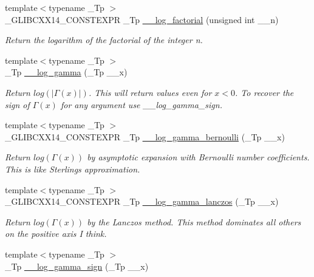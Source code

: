 \begin{DoxyCompactItemize}
{\footnotesize template$<$typename \+\_\+\+Tp $>$ }\\\+\_\+\+G\+L\+I\+B\+C\+X\+X14\+\_\+\+C\+O\+N\+S\+T\+E\+X\+P\+R \+\_\+\+Tp \hyperlink{namespacestd_1_1____detail_a2809419dbbe9fc60066dacfdc13761d4}{\+\_\+\+\_\+log\+\_\+factorial} (unsigned int \+\_\+\+\_\+n)
\begin{DoxyCompactList}\small\item\em Return the logarithm of the factorial of the integer n. \end{DoxyCompactList}\item 
{\footnotesize template$<$typename \+\_\+\+Tp $>$ }\\\+\_\+\+Tp \hyperlink{namespacestd_1_1____detail_aa8be6df2c5d12d0d1cb1f02a6b3592ef}{\+\_\+\+\_\+log\+\_\+gamma} (\+\_\+\+Tp \+\_\+\+\_\+x)
\begin{DoxyCompactList}\small\item\em Return $ log(|\Gamma(x)|) $. This will return values even for $ x < 0 $. To recover the sign of $ \Gamma(x) $ for any argument use {\itshape \+\_\+\+\_\+log\+\_\+gamma\+\_\+sign}. \end{DoxyCompactList}\item 
{\footnotesize template$<$typename \+\_\+\+Tp $>$ }\\\+\_\+\+G\+L\+I\+B\+C\+X\+X14\+\_\+\+C\+O\+N\+S\+T\+E\+X\+P\+R \+\_\+\+Tp \hyperlink{namespacestd_1_1____detail_ac13e31ebcd3c99d6a7cad9010e039315}{\+\_\+\+\_\+log\+\_\+gamma\+\_\+bernoulli} (\+\_\+\+Tp \+\_\+\+\_\+x)
\begin{DoxyCompactList}\small\item\em Return $log(\Gamma(x))$ by asymptotic expansion with Bernoulli number coefficients. This is like Sterling\textquotesingle{}s approximation. \end{DoxyCompactList}\item 
{\footnotesize template$<$typename \+\_\+\+Tp $>$ }\\\+\_\+\+G\+L\+I\+B\+C\+X\+X14\+\_\+\+C\+O\+N\+S\+T\+E\+X\+P\+R \+\_\+\+Tp \hyperlink{namespacestd_1_1____detail_a45d7248fb07a96bc70546b0817a4564e}{\+\_\+\+\_\+log\+\_\+gamma\+\_\+lanczos} (\+\_\+\+Tp \+\_\+\+\_\+x)
\begin{DoxyCompactList}\small\item\em Return $log(\Gamma(x))$ by the Lanczos method. This method dominates all others on the positive axis I think. \end{DoxyCompactList}\item 
{\footnotesize template$<$typename \+\_\+\+Tp $>$ }\\\+\_\+\+Tp \hyperlink{namespacestd_1_1____detail_ac091f187fbe5efdbc912ec9ca38ba25f}{\+\_\+\+\_\+log\+\_\+gamma\+\_\+sign} (\+\_\+\+Tp \+\_\+\+\_\+x)

\end{DoxyCompactItemize}
